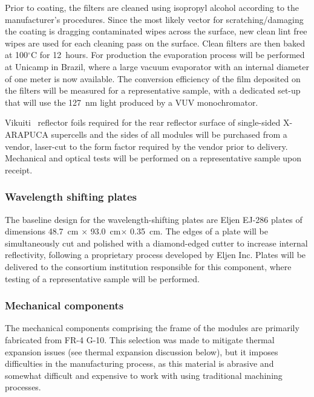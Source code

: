 Prior to coating, the filters are cleaned using isopropyl alcohol according to the manufacturer's procedures. %
Since the most likely vector for scratching/damaging the coating is dragging contaminated wipes across the surface, new clean lint free wipes are used for each  cleaning pass on the surface. Clean filters are then baked at 100$^\circ$C for \SI{12}{hours}. 
For   production the evaporation process will be performed at Unicamp in Brazil, 
 where a large vacuum evaporator with an internal diameter of one meter is now available. The conversion efficiency of the film deposited on the filters will be measured for a representative sample, with a dedicated set-up that will use the \SI{127}{nm} light produced by a VUV monochromator.

Vikuiti \texttrademark\ reflector foils required for the rear reflector surface of single-sided X-ARAPUCA supercells and the sides of all modules will be purchased from a vendor, laser-cut to the form factor required by the vendor prior to delivery.  Mechanical and optical  tests will be performed on a representative sample upon receipt.

\subsubsection{Wavelength shifting plates}

The baseline design for the wavelength-shifting plates are %
Eljen EJ-286 plates of dimensions \SI{48.7}{cm} $\times$ \SI{93.0}{cm}$\times$ \SI{0.35}{cm}.  The edges of a plate will be simultaneously cut and polished with a diamond-edged cutter to increase internal reflectivity, following a proprietary process developed by Eljen Inc.  Plates will be delivered to the consortium institution responsible for this component, where  testing of a representative sample will be performed.

\subsubsection{Mechanical components}

The mechanical components comprising the frame of the  modules are primarily fabricated from FR-4 G-10.  This selection was made to mitigate thermal expansion issues (see thermal expansion discussion below), but it imposes difficulties in the manufacturing process, as this material is abrasive and somewhat difficult and expensive to work with using traditional machining processes.

